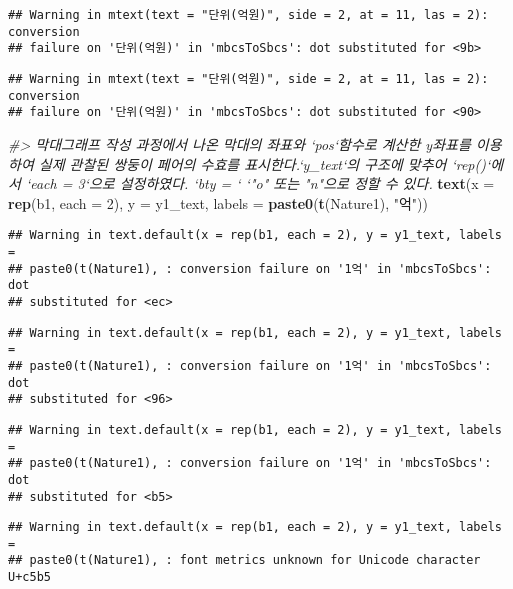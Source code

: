 \documentclass[
]{article}
\newenvironment{Shaded}{\begin{snugshade}}{\end{snugshade}}
\newcommand{\CommentTok}[1]{\textcolor[rgb]{0.56,0.35,0.01}{\textit{#1}}}
\newcommand{\DataTypeTok}[1]{\textcolor[rgb]{0.13,0.29,0.53}{#1}}
\newcommand{\DecValTok}[1]{\textcolor[rgb]{0.00,0.00,0.81}{#1}}
\newcommand{\KeywordTok}[1]{\textcolor[rgb]{0.13,0.29,0.53}{\textbf{#1}}}
\newcommand{\NormalTok}[1]{#1}
\newcommand{\StringTok}[1]{\textcolor[rgb]{0.31,0.60,0.02}{#1}}
\begin{document}
\begin{verbatim}
## Warning in mtext(text = "단위(억원)", side = 2, at = 11, las = 2): conversion
## failure on '단위(억원)' in 'mbcsToSbcs': dot substituted for <9b>
\end{verbatim}

\begin{verbatim}
## Warning in mtext(text = "단위(억원)", side = 2, at = 11, las = 2): conversion
## failure on '단위(억원)' in 'mbcsToSbcs': dot substituted for <90>
\end{verbatim}

\begin{Shaded}
\begin{Highlighting}[]
\CommentTok{#> 막대그래프 작성 과정에서 나온 막대의 좌표와 `pos`함수로 계산한 y좌표를 이용하여 실제 관찰된 쌍둥이 페어의 수효를 표시한다.`y_text`의 구조에 맞추어 `rep()`에서 `each = 3`으로 설정하였다. `bty = ` `"o" 또는 "n"으로 정할 수 있다. }
\KeywordTok{text}\NormalTok{(}\DataTypeTok{x =} \KeywordTok{rep}\NormalTok{(b1, }\DataTypeTok{each =} \DecValTok{2}\NormalTok{), }
     \DataTypeTok{y =}\NormalTok{ y1_text, }
     \DataTypeTok{labels =} \KeywordTok{paste0}\NormalTok{(}\KeywordTok{t}\NormalTok{(Nature1), }\StringTok{"억"}\NormalTok{))}
\end{Highlighting}
\end{Shaded}

\begin{verbatim}
## Warning in text.default(x = rep(b1, each = 2), y = y1_text, labels =
## paste0(t(Nature1), : conversion failure on '1억' in 'mbcsToSbcs': dot
## substituted for <ec>
\end{verbatim}

\begin{verbatim}
## Warning in text.default(x = rep(b1, each = 2), y = y1_text, labels =
## paste0(t(Nature1), : conversion failure on '1억' in 'mbcsToSbcs': dot
## substituted for <96>
\end{verbatim}

\begin{verbatim}
## Warning in text.default(x = rep(b1, each = 2), y = y1_text, labels =
## paste0(t(Nature1), : conversion failure on '1억' in 'mbcsToSbcs': dot
## substituted for <b5>
\end{verbatim}

\begin{verbatim}
## Warning in text.default(x = rep(b1, each = 2), y = y1_text, labels =
## paste0(t(Nature1), : font metrics unknown for Unicode character U+c5b5
\end{verbatim}
\end{document}
